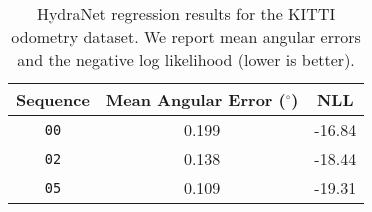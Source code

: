 
\begin{table}[]
\centering
\caption{HydraNet regression results for the KITTI odometry dataset. We report mean angular errors and the negative log likelihood (lower is better).}
	\begin{threeparttable}
	\begin{tabular}{ccc} \toprule
		\textbf{Sequence}  & \textbf{Mean Angular Error ($^{\circ}$)} & \textbf{NLL} \\ \midrule
		\texttt{00} & 0.199 & -16.84 \\
		\texttt{02} & 0.138 & -18.44 \\
		\texttt{05} & 0.109 & -19.31 \\
	 \bottomrule
	\end{tabular}
	\end{threeparttable}
	\label{tab:kitti_hydranet_stats}
\end{table}

